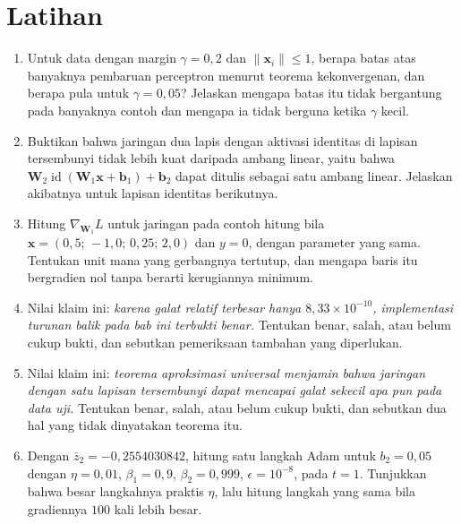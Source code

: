 \section{Latihan}

\begin{latihan}
\begin{enumerate}
  \item Untuk data dengan margin $\gamma=0{,}2$ dan $\lVert\mathbf{x}_{i}\rVert\le1$, berapa batas atas banyaknya pembaruan perceptron menurut teorema kekonvergenan, dan berapa pula untuk $\gamma=0{,}05$? Jelaskan mengapa batas itu tidak bergantung pada banyaknya contoh dan mengapa ia tidak berguna ketika $\gamma$ kecil.

  \item Buktikan bahwa jaringan dua lapis dengan aktivasi identitas di lapisan tersembunyi
        tidak lebih kuat daripada ambang linear, yaitu bahwa
        $\mathbf{W}_{2}\operatorname{id}(\mathbf{W}_{1}\mathbf{x}+\mathbf{b}_{1})+\mathbf{b}_{2}$
        dapat ditulis sebagai satu ambang linear. Jelaskan akibatnya untuk lapisan identitas berikutnya.

  

  \item Hitung $\nabla_{\mathbf{W}_{1}}L$ untuk jaringan pada contoh hitung bila $\mathbf{x}=(0{,}5;\,-1{,}0;\,0{,}25;\,2{,}0)$ dan $y=0$, dengan parameter yang sama. Tentukan unit mana yang gerbangnya tertutup, dan mengapa baris itu bergradien nol tanpa berarti kerugiannya minimum.

  \item Nilai klaim ini: \emph{karena galat relatif terbesar hanya
        $8{,}33\times10^{-10}$, implementasi turunan balik pada bab ini terbukti benar.}
        Tentukan benar, salah, atau belum cukup bukti, dan sebutkan pemeriksaan tambahan
        yang diperlukan.

  \item Nilai klaim ini: \emph{teorema aproksimasi universal menjamin bahwa jaringan dengan
        satu lapisan tersembunyi dapat mencapai galat sekecil apa pun pada data uji.}
        Tentukan benar, salah, atau belum cukup bukti, dan sebutkan dua hal yang tidak
        dinyatakan teorema itu.

  \item Dengan $\bar{z}_{2}=-0{,}2554030842$, hitung satu langkah Adam untuk $b_{2}=0{,}05$
        dengan $\eta=0{,}01$, $\beta_{1}=0{,}9$, $\beta_{2}=0{,}999$, $\epsilon=10^{-8}$,
        pada $t=1$. Tunjukkan bahwa besar langkahnya praktis $\eta$, lalu hitung langkah yang sama bila gradiennya $100$ kali lebih besar.


\end{enumerate}
\end{latihan}
